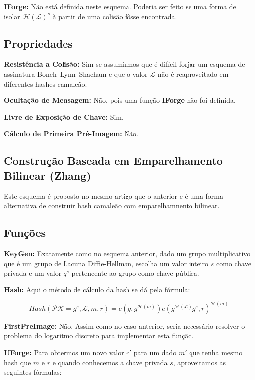 \documentclass[a4paper]{article}
\begin{document}
\textbf{IForge:} Não está definida neste esquema. Poderia ser feito se
uma forma de isolar $\mathcal{H}(\mathcal{L})^s$ à partir de uma
colisão fôsse encontrada.

\subsection{Propriedades}

\textbf{Resistência a Colisão: }Sim se assumirmos que é difícil forjar
um esquema de assinatura Boneh–Lynn–Shacham e que o valor
$\mathcal{L}$ não é reaproveitado em diferentes hashes camaleão.

\textbf{Ocultação de Mensagem: }Não, pois uma função \textbf{IForge}
não foi definida.

\textbf{Livre de Exposição de Chave: } Sim.

\textbf{Cálculo de Primeira Pré-Imagem: }Não.

\subsection{Construção Baseada em Emparelhamento Bilinear (Zhang) \cite{zhang}}

Este esquema é proposto no mesmo artigo que o anterior e é uma forma
alternativa de construir hash camaleão com emparelhamnento bilinear.

\subsection{Funções}

\textbf{KeyGen: }Exatamente como no esquema anterior, dado um grupo
multiplicativo que é um grupo de Lacuna Diffie-Hellman, escolha um
valor inteiro $s$ como chave privada e um valor $g^s$ pertencente ao
grupo como chave pública.

\textbf{Hash: } Aqui o método de cálculo da hash se dá pela fórmula:

$$
Hash(\mathcal{PK}=g^s, \mathcal{L}, m, r) = e(g, g^{\mathcal{H}(m)})e(g^{\mathcal{H}(\mathcal{L})}g^s, r)^{\mathcal{H}(m)}
$$

\textbf{FirstPreImage:} Não. Assim como no caso anterior, seria
necessário resolver o problema do logaritmo discreto para implementar
esta função.

\textbf{UForge:} Para obtermos um novo valor $r'$ para um dado $m'$
que tenha mesmo hash que $m$ e $r$ e quando conhecemos a chave privada
$s$, aproveitamos as seguintes fórmulas:
\end{document}
